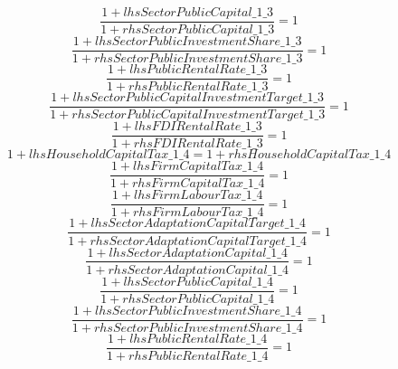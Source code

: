 \begin{dmath}
\frac{1+{lhsSectorPublicCapital\_1\_3}}{1+{rhsSectorPublicCapital\_1\_3}}=1
\end{dmath}
\begin{dmath}
\frac{1+{lhsSectorPublicInvestmentShare\_1\_3}}{1+{rhsSectorPublicInvestmentShare\_1\_3}}=1
\end{dmath}
\begin{dmath}
\frac{1+{lhsPublicRentalRate\_1\_3}}{1+{rhsPublicRentalRate\_1\_3}}=1
\end{dmath}
\begin{dmath}
\frac{1+{lhsSectorPublicCapitalInvestmentTarget\_1\_3}}{1+{rhsSectorPublicCapitalInvestmentTarget\_1\_3}}=1
\end{dmath}
\begin{dmath}
\frac{1+{lhsFDIRentalRate\_1\_3}}{1+{rhsFDIRentalRate\_1\_3}}=1
\end{dmath}
\begin{dmath}
1+{lhsHouseholdCapitalTax\_1\_4}=1+{rhsHouseholdCapitalTax\_1\_4}
\end{dmath}
\begin{dmath}
\frac{1+{lhsFirmCapitalTax\_1\_4}}{1+{rhsFirmCapitalTax\_1\_4}}=1
\end{dmath}
\begin{dmath}
\frac{1+{lhsFirmLabourTax\_1\_4}}{1+{rhsFirmLabourTax\_1\_4}}=1
\end{dmath}
\begin{dmath}
\frac{1+{lhsSectorAdaptationCapitalTarget\_1\_4}}{1+{rhsSectorAdaptationCapitalTarget\_1\_4}}=1
\end{dmath}
\begin{dmath}
\frac{1+{lhsSectorAdaptationCapital\_1\_4}}{1+{rhsSectorAdaptationCapital\_1\_4}}=1
\end{dmath}
\begin{dmath}
\frac{1+{lhsSectorPublicCapital\_1\_4}}{1+{rhsSectorPublicCapital\_1\_4}}=1
\end{dmath}
\begin{dmath}
\frac{1+{lhsSectorPublicInvestmentShare\_1\_4}}{1+{rhsSectorPublicInvestmentShare\_1\_4}}=1
\end{dmath}
\begin{dmath}
\frac{1+{lhsPublicRentalRate\_1\_4}}{1+{rhsPublicRentalRate\_1\_4}}=1
\end{dmath}
